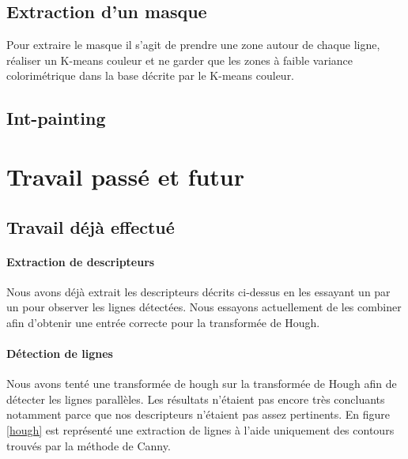 \documentclass[10pt,a4paper]{article}
\begin{document}
\subsection{Extraction d'un masque}
Pour extraire le masque il s'agit de prendre une zone autour de chaque ligne, réaliser un K-means couleur et ne garder que les zones à faible variance colorimétrique dans la base décrite par le K-means couleur.

\subsection{Int-painting}


\section{Travail passé et futur}
\subsection{Travail déjà effectué}
\paragraph{Extraction de descripteurs} Nous avons déjà extrait les descripteurs décrits ci-dessus en les essayant un par un pour observer les lignes détectées. Nous essayons actuellement de les combiner afin d'obtenir une entrée correcte pour la transformée de Hough.

\paragraph{Détection de lignes} Nous avons tenté une transformée de hough sur la transformée de Hough afin de détecter les lignes parallèles. Les résultats n'étaient pas encore très concluants notamment parce que nos descripteurs n'étaient pas assez pertinents. En figure \ref{hough} est représenté une extraction de lignes à l'aide uniquement des contours trouvés par la méthode de Canny.
\end{document}

